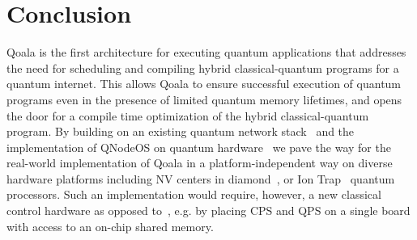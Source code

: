 \section{Conclusion}
\label{qoala:sec:conclusion}
Qoala is the first architecture for executing quantum applications that addresses the need for scheduling and compiling hybrid classical-quantum programs for a quantum internet.
This allows Qoala to ensure successful execution of quantum programs even in the presence of limited quantum memory lifetimes, and opens the door for a compile time optimization of the hybrid classical-quantum program.
By building on an existing quantum network stack~\cite{dahlberg2019link, pompili2022experimental} and the implementation of QNodeOS on quantum hardware~\cite{pompili2022experimental, carlothesis} we pave the way for the real-world implementation of Qoala in a platform-independent way on diverse hardware platforms including NV centers in diamond~\cite{pompili2021realization, pompili2022experimental}, or Ion Trap~\cite{krutyanskiy2023entanglement,krutyanskiy2023telecom} quantum processors. 
Such an implementation would require, however, a new classical control hardware as opposed to~\cite{pompili2022experimental, carlothesis}, e.g. by placing CPS and QPS on a single board with access to an on-chip shared memory. 

